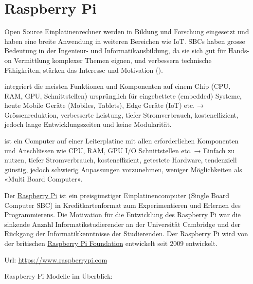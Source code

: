 \documentclass[
  11pt,
  a4paperpaper,
  oneside, openany  ,captions=tableheading
]{scrbook}
\providecommand{\tightlist}{%
  \setlength{\itemsep}{0pt}\setlength{\parskip}{0pt}}
\theoremstyle{definition}
\theoremstyle{remark}
\begin{document}
\cleardoublepage
{}
{}
\appendix

\chapter{Raspberry Pi}\label{raspberry-pi}

Open Source Einplatinenrechner werden in Bildung und Forschung
eingesetzt und haben eine breite Anwendung in weiteren Bereichen wie
IoT. SBCs haben grosse Bedeutung in der Ingenieur- und
Informatikausbildung, da sie sich gut für Hands-on Vermittlung komplexer
Themen eignen, und verbessern technische Fähigkeiten, stärken das
Interesse und Motivation ().

\begin{description}
\tightlist
\item[System on Chip SOC \index{System on Chip SOC}]
integriert die meisten Funktionen und Komponenten auf einem Chip (CPU,
RAM, GPU, Schnittstellen) ursprünglich für eingebettete (embedded)
Systeme, heute Mobile Geräte (Mobiles, Tablets), Edge Geräte (IoT) etc.
→ Grössenreduktion, verbesserte Leistung, tiefer Stromverbrauch,
kosteneffizient, jedoch lange Entwicklungszeiten und keine Modularität.
\item[Single Board Computer SBC \index{Single Board Computer SBC}]
ist ein Computer auf einer Leiterplatine mit allen erforderlichen
Komponenten und Anschlüssen wie CPU, RAM, GPU I/O Schnittstellen etc. →
Einfach zu nutzen, tiefer Stromverbrauch, kosteneffizient, getestete
Hardware, tendenziell günstig, jedoch schwierig Anpassungen vorzunehmen,
weniger Möglichkeiten als «Multi Board Computer».
\end{description}

Der \href{https://www.raspberrypi.com}{Raspberry Pi}
ist ein preisgünstiger Einplatinencomputer (Single Board Computer SBC)
in Kreditkartenformat zum Experimentieren und Erlernen des
Programmierens. Die Motivation für die Entwicklung des Raspberry Pi war
die sinkende Anzahl Informatikstudierender an der Universität Cambridge
und der Rückgang der Informatikkenntnisse der Studierenden. Der
Raspberry Pi wird von der britischen
\href{https://www.raspberrypi.org}{Raspberry Pi Foundation} entwickelt
seit 2009 entwickelt.

Url: \url{https://www.raspberrypi.com}

Raspberry Pi Modelle im Überblick:
\end{document}
